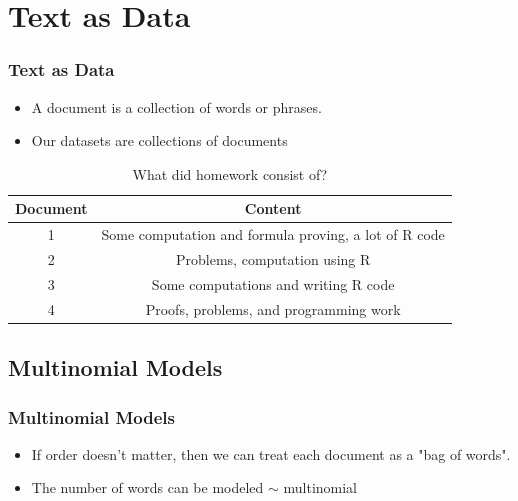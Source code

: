 \documentclass{beamer}
\begin{document}
\section{Text as Data }
\begin{frame}
 \frametitle{Text as Data}
 \begin{itemize}
\pause
\item A document is a collection of words or phrases.
\pause
\item Our datasets are collections of documents
\end{itemize}
\pause
\begin{table}[!hbpt]
\caption{What did homework consist of? } \label{tab:title}
\pause
\begin{center}
\begin{tabular} {c c}
\textbf{Document} & \textbf{Content} \\
\hline
1 & Some computation and formula proving, a lot of R code \\
2 & Problems, computation using R \\
3 & Some computations and writing R code\\
4 & Proofs, problems, and programming work \\
\end{tabular}
\end{center}
\end{table}
\end{frame}

\subsection[Basic Structure]{Multinomial Models}
\begin{frame}
\pause
\frametitle{Multinomial Models}
\begin{itemize}
\item If order doesn't matter, then we can treat each document as a "bag of words". 
\pause
\item The number of words can be modeled $\sim$ multinomial
\pause
\end{itemize}
\begin{table}[!hbpt]
\caption{Creating a word-count matrix from text}
\begin{center}
\end{center}
\end{table} 
\end{frame}
\end{document}
